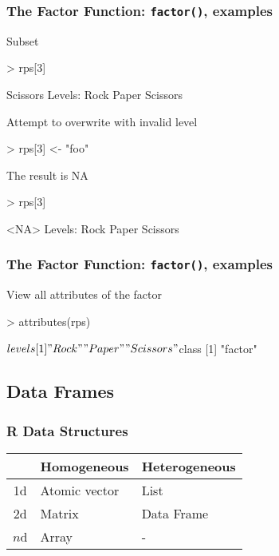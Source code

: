\documentclass{beamer}
\newcommand{\R}[1]{\texttt{#1}}
\begin{document}
\begin{frame}[fragile]
\frametitle{The Factor Function: \R{factor()}, examples}

Subset
\begin{Schunk}
\begin{Sinput}
> rps[3]
\end{Sinput}
\begin{Soutput}
[1] Scissors
Levels: Rock Paper Scissors
\end{Soutput}
\end{Schunk}
\pause
Attempt to overwrite with invalid level
\begin{Schunk}
\begin{Sinput}
> rps[3] <- "foo"
\end{Sinput}
\end{Schunk}
\pause
The result is NA
\begin{Schunk}
\begin{Sinput}
> rps[3]
\end{Sinput}
\begin{Soutput}
[1] <NA>
Levels: Rock Paper Scissors
\end{Soutput}
\end{Schunk}

\end{frame}



\begin{frame}[fragile]
\frametitle{The Factor Function: \R{factor()}, examples}

View all attributes of the factor
\begin{Schunk}
\begin{Sinput}
> attributes(rps)
\end{Sinput}
\begin{Soutput}
$levels
[1] "Rock"     "Paper"    "Scissors"

$class
[1] "factor"
\end{Soutput}
\end{Schunk}
\end{frame}



\subsection{Data Frames}

\begin{frame}
\frametitle{R Data Structures}

\begin{table}
\begin{tabular}{c|ll}
   &  Homogeneous   & Heterogeneous \\ \hline
1d &  Atomic vector &  List \\
2d & Matrix        & \cellcolor{gray!25} Data Frame \\
$n$d & Array       & - \\ 
\end{tabular}
\end{table}

\end{frame}
\end{document}
